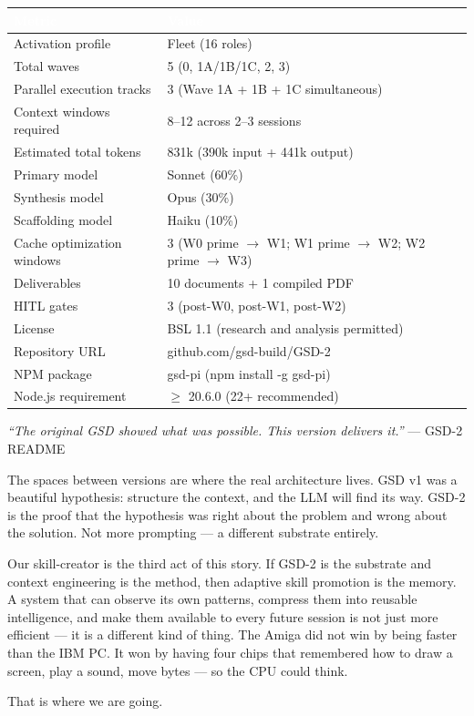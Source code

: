 \documentclass[11pt,letterpaper]{article}
\newcommand{\tableheader}[1]{\textbf{\sffamily\textcolor{white}{#1}}}
\begin{document}
\begin{center}
\begin{tabularx}{\textwidth}{L{5cm}X}
\toprule
{}
\tableheader{Metric} & \tableheader{Value} \\
\midrule
Activation profile & Fleet (16 roles) \\
Total waves & 5 (0, 1A/1B/1C, 2, 3) \\
Parallel execution tracks & 3 (Wave 1A + 1B + 1C simultaneous) \\
Context windows required & 8--12 across 2--3 sessions \\
Estimated total tokens & 831k (390k input + 441k output) \\
Primary model & Sonnet (60\%) \\
Synthesis model & Opus (30\%) \\
Scaffolding model & Haiku (10\%) \\
Cache optimization windows & 3 (W0 prime $\to$ W1; W1 prime $\to$ W2; W2 prime $\to$ W3) \\
Deliverables & 10 documents + 1 compiled PDF \\
HITL gates & 3 (post-W0, post-W1, post-W2) \\
License & BSL 1.1 (research and analysis permitted) \\
Repository URL & github.com/gsd-build/GSD-2 \\
NPM package & gsd-pi (npm install -g gsd-pi) \\
Node.js requirement & $\geq$ 20.6.0 (22+ recommended) \\
\bottomrule
\end{tabularx}
\end{center}

\vspace{2em}

\begin{quotebox}
\textit{``The original GSD showed what was possible. This version delivers it.''} --- GSD-2 README

\medskip

The spaces between versions are where the real architecture lives. GSD v1 was a beautiful hypothesis: structure the context, and the LLM will find its way. GSD-2 is the proof that the hypothesis was right about the problem and wrong about the solution. Not more prompting --- a different substrate entirely.

Our skill-creator is the third act of this story. If GSD-2 is the substrate and context engineering is the method, then adaptive skill promotion is the memory. A system that can observe its own patterns, compress them into reusable intelligence, and make them available to every future session is not just more efficient --- it is a different kind of thing. The Amiga did not win by being faster than the IBM PC. It won by having four chips that remembered how to draw a screen, play a sound, move bytes --- so the CPU could think.

That is where we are going.
\end{quotebox}
\end{document}
